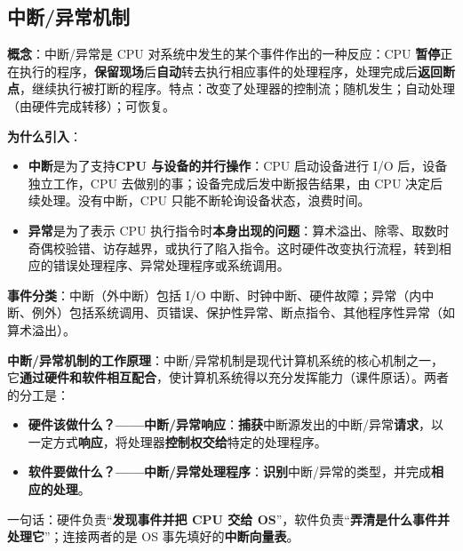 \subsection{中断/异常机制}

\textbf{概念}：中断/异常是 CPU 对系统中发生的某个事件作出的一种反应：CPU \textbf{暂停}正在执行的程序，\textbf{保留现场}后\textbf{自动}转去执行相应事件的处理程序，处理完成后\textbf{返回断点}，继续执行被打断的程序。特点：改变了处理器的控制流；随机发生；自动处理（由硬件完成转移）；可恢复。

\textbf{为什么引入}：
\begin{itemize}
    \item \textbf{中断}是为了支持\textbf{CPU 与设备的并行操作}：CPU 启动设备进行 I/O 后，设备独立工作，CPU 去做别的事；设备完成后发中断报告结果，由 CPU 决定后续处理。没有中断，CPU 只能不断轮询设备状态，浪费时间。
    \item \textbf{异常}是为了表示 CPU 执行指令时\textbf{本身出现的问题}：算术溢出、除零、取数时奇偶校验错、访存越界，或执行了陷入指令。这时硬件改变执行流程，转到相应的错误处理程序、异常处理程序或系统调用。
\end{itemize}
\textbf{事件分类}：中断（外中断）包括 I/O 中断、时钟中断、硬件故障；异常（内中断、例外）包括系统调用、页错误、保护性异常、断点指令、其他程序性异常（如算术溢出）。

\textbf{中断/异常机制的工作原理}：中断/异常机制是现代计算机系统的核心机制之一，它\textbf{通过硬件和软件相互配合}，使计算机系统得以充分发挥能力（课件原话）。两者的分工是：
\begin{itemize}
    \item \textbf{硬件该做什么？——中断/异常响应}：\textbf{捕获}中断源发出的中断/异常\textbf{请求}，以一定方式\textbf{响应}，将处理器\textbf{控制权交给}特定的处理程序。
    \item \textbf{软件要做什么？——中断/异常处理程序}：\textbf{识别}中断/异常的类型，并完成\textbf{相应的处理}。
\end{itemize}
一句话：硬件负责“\textbf{发现事件并把 CPU 交给 OS}”，软件负责“\textbf{弄清是什么事件并处理它}”；连接两者的是 OS 事先填好的\textbf{中断向量表}。

